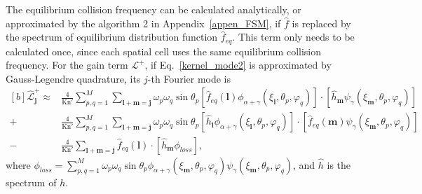 The equilibrium collision frequency can be calculated analytically, or approximated by the algorithm 2 in Appendix~\ref{appen_FSM}, if $\hat{f}$ is replaced by the spectrum of  equilibrium distribution function $\hat{f}_{eq}$. This term only needs to be calculated once, since each spatial cell uses the same equilibrium collision frequency. For the gain term $\mathcal{L}^+$, if Eq.~\eqref{kernel_mode2} is approximated by Gauss-Legendre quadrature, its $j$-th Fourier mode is 
\begin{equation}\label{detailed_linear}
\begin{aligned}[b]
\widehat{\mathcal{L}}^+_{\bm{j}}\approx &\frac{4}{\text{Kn}'}\sum_{p,q=1}^{M} \sum_{\bm{l}+\bm{m}=\bm{j}}\omega_p\omega_q\sin\theta_p[\hat{f}_{eq}(\bm{l}){\phi_{\alpha+\gamma}(\xi_{\bm{l}},\theta_p,\varphi_q)}]\cdot[\hat{h}_{\bm{m}}{\psi_{\gamma}(\xi_{\bm{m}},\theta_p,\varphi_q)}]\\
+&\frac{4}{\text{Kn}'}\sum_{p,q=1}^{M} \sum_{\bm{l}+\bm{m}=\bm{j}}\omega_p\omega_q\sin\theta_p[\hat{h}_{\bm{l}}{\phi_{\alpha+\gamma}(\xi_{\bm{l}},\theta_p,\varphi_q)}]\cdot[\hat{f}_{eq}(\bm{m}){\psi_{\gamma}(\xi_{\bm{m}},\theta_p,\varphi_q)}]
\\
-&\frac{4}{\text{Kn}'}\sum_{\bm{l}+\bm{m}=\bm{j}}\hat{f}_{eq}(\bm{l})\cdot[\hat{h}_{\bm{m}}{\phi_{loss}}],
\end{aligned}
\end{equation}
where
$
\phi_{loss}=\sum_{p,q=1}^{M}\omega_p\omega_q\sin\theta_p\phi_{\alpha+\gamma}(\xi_{\bm{m}},\theta_p,\varphi_q)    \psi_{\gamma}(\xi_{\bm{m}},\theta_p,\varphi_q)$,
and $\hat{h}$ is the spectrum of $h$.


